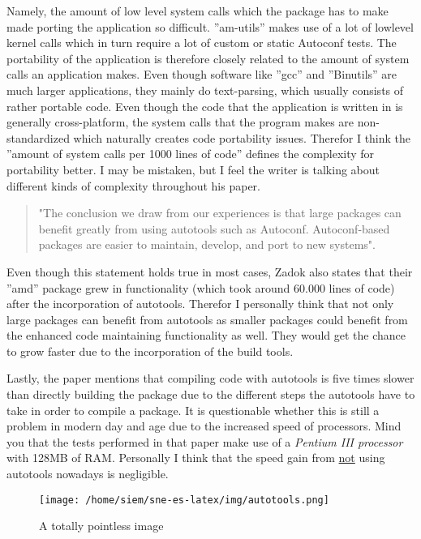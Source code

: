 Namely, the amount of low level system calls which the package has to make made porting the application so difficult. ''am-utils'' makes use of a lot of lowlevel kernel calls which in turn require a lot of custom or static Autoconf tests. The portability of the application is therefore closely related to the amount of system calls an application makes. Even though software like ''gcc'' and ''Binutils'' are much larger applications, they mainly do text-parsing, which usually consists of rather portable code. Even though the code that the application is written in is generally cross-platform, the system calls that the program makes are non-standardized which naturally creates code portability issues. Therefor I think the ''amount of system calls per 1000 lines of code'' defines the complexity for portability better. I may be mistaken, but I feel the writer is talking about different kinds of complexity throughout his paper. 

\begin{quotation}
"The conclusion we draw from our experiences is that large packages can benefit greatly from using autotools such as Autoconf. Autoconf-based packages are easier to maintain, develop, and port to new systems".
\end{quotation}

Even though this statement holds true in most cases, Zadok also states that their ''amd'' package grew in functionality (which took around 60.000 lines of code) after the incorporation of autotools. Therefor I personally think that not only large packages can benefit from autotools as smaller packages could benefit from the enhanced code maintaining functionality as well. They would get the chance to grow faster due to the incorporation of the build tools. 

Lastly, the paper mentions that compiling code with autotools is five times slower than directly building the package due to the different steps the autotools have to take in order to compile a package. It is questionable whether this is still a problem in modern day and age due to the increased speed of processors. Mind you that the tests performed in that paper make use of a \textit{Pentium III processor} with 128MB of RAM. Personally I think that the speed gain from \underline{not} using autotools nowadays is negligible. 

\begin{figure}[H]
	\centering
	\texttt{[image: /home/siem/sne-es-latex/img/autotools.png]}
	\caption{A totally pointless image}
	\label{fig:pointlessimage}
\end{figure}

